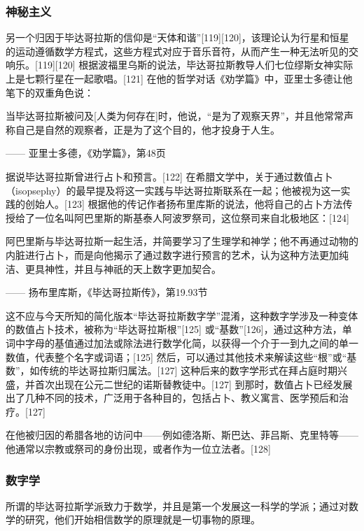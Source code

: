 \subsubsection{神秘主义}  
另一个归因于毕达哥拉斯的信仰是“天体和谐”[119][120]，该理论认为行星和恒星的运动遵循数学方程式，这些方程式对应于音乐音符，从而产生一种无法听见的交响乐。[119][120] 根据波福里乌斯的说法，毕达哥拉斯教导人们七位缪斯女神实际上是七颗行星在一起歌唱。[121] 在他的哲学对话《劝学篇》中，亚里士多德让他笔下的双重角色说：

当毕达哥拉斯被问及[人类为何存在]时，他说，“是为了观察天界”，并且他常常声称自己是自然的观察者，正是为了这个目的，他才投身于人生。

—— 亚里士多德，《劝学篇》，第48页

据说毕达哥拉斯曾进行占卜和预言。[122] 在希腊文学中，关于通过数值占卜（isopsephy）的最早提及将这一实践与毕达哥拉斯联系在一起；他被视为这一实践的创始人。[123] 根据他的传记作者扬布里库斯的说法，他将自己的占卜方法传授给了一位名叫阿巴里斯的斯基泰人阿波罗祭司，这位祭司来自北极地区：[124]

阿巴里斯与毕达哥拉斯一起生活，并简要学习了生理学和神学；他不再通过动物的内脏进行占卜，而是向他揭示了通过数字进行预言的艺术，认为这种方法更加纯洁、更具神性，并且与神祇的天上数字更加契合。

—— 扬布里库斯，《毕达哥拉斯传》，第19.93节

这不应与今天所知的简化版本“毕达哥拉斯数字学”混淆，这种数字学涉及一种变体的数值占卜技术，被称为“毕达哥拉斯根”[125] 或“基数”[126]，通过这种方法，单词中字母的基值通过加法或除法进行数学化简，以获得一个介于一到九之间的单一数值，代表整个名字或词语；[125] 然后，可以通过其他技术来解读这些“根”或“基数”，如传统的毕达哥拉斯归属法。[127] 这种后来的数字学形式在拜占庭时期兴盛，并首次出现在公元二世纪的诺斯替教徒中。[127] 到那时，数值占卜已经发展出了几种不同的技术，广泛用于各种目的，包括占卜、教义寓言、医学预后和治疗。[127]

在他被归因的希腊各地的访问中——例如德洛斯、斯巴达、菲吕斯、克里特等——他通常以宗教或祭司的身份出现，或者作为一位立法者。[128]
\subsubsection{数字学}  
所谓的毕达哥拉斯学派致力于数学，并且是第一个发展这一科学的学派；通过对数学的研究，他们开始相信数学的原理就是一切事物的原理。

